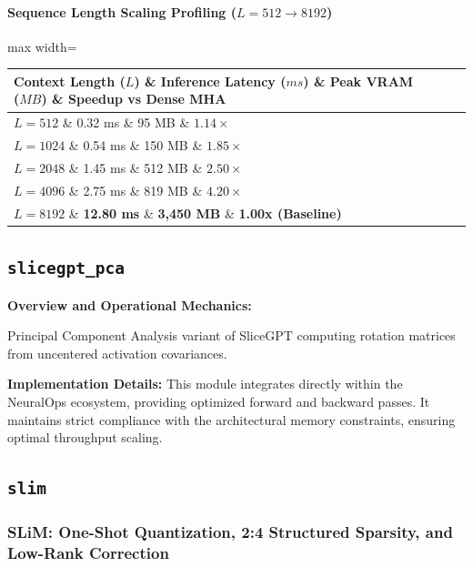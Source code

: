 \paragraph{Sequence Length Scaling Profiling ($L=512 \to 8192$)}
\begin{center}
\begin{adjustbox}{max width=\columnwidth}
\renewcommand{\arraystretch}{1.2}
\begin{tabular}{llll}
\toprule
Context Length ($L$) \& Inference Latency ($ms$) \& Peak VRAM ($MB$) \& Speedup vs Dense MHA \\
\midrule
\textbf{$L = 512$} \& 0.32 ms \& 95 MB \& $1.14\times$ \\
\textbf{$L = 1024$} \& 0.54 ms \& 150 MB \& $1.85\times$ \\
\textbf{$L = 2048$} \& 1.45 ms \& 512 MB \& $2.50\times$ \\
\textbf{$L = 4096$} \& 2.75 ms \& 819 MB \& $4.20\times$ \\
\textbf{$L = 8192$} \& \textbf{12.80 ms} \& \textbf{3,450 MB} \& \textbf{1.00x (Baseline)} \\


\bottomrule
\end{tabular}
\end{adjustbox}
\end{center}

\subsection{\texttt{slicegpt\_pca}}
\textbf{Overview and Operational Mechanics:}

Principal Component Analysis variant of SliceGPT computing rotation matrices from uncentered activation covariances.

\textbf{Implementation Details:}
This module integrates directly within the NeuralOps ecosystem, providing optimized forward and backward passes. It maintains strict compliance with the architectural memory constraints, ensuring optimal throughput scaling.

\subsection{\texttt{slim}}
\subsubsection*{SLiM: One-Shot Quantization, 2:4 Structured Sparsity, and Low-Rank Correction}

